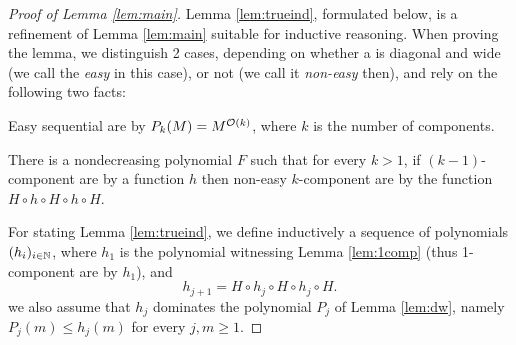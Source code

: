 \begin{proof}[Proof of Lemma \ref{lem:main}]
%
Lemma \ref{lem:trueind}, formulated below, is a refinement of Lemma \ref{lem:main} suitable for 
inductive reasoning.
When proving the lemma, we distinguish 2 cases, depending on whether
a \tvass  is diagonal and wide (we call the \tvass \emph{easy} in this case), 
or not (we call it \emph{non-easy} then), and rely on the following two facts:
%
\begin{lemma} \label{lem:dw}
Easy sequential \tvass are \lb by $P_k(M) = M^{{\cal O}(k)}$, where $k$ is the number of components.
\end{lemma}
%
%
\begin{lemma} \label{lem:ne}
There is a nondecreasing polynomial $F$ such that for every $k > 1$,
if $(k-1)$-component \tvass are \lb by a function $h$ then
non-easy $k$-component \tvass are \lb by the function $H \circ h \circ H \circ h \circ H$.
\end{lemma}
%
For stating Lemma \ref{lem:trueind},
we define inductively a sequence of polynomials $(h_i)_{i\in\mathbb{N}}$, where
$h_1$ is the polynomial witnessing Lemma \ref{lem:1comp}
(thus 1-component \tvass are \lb by $h_1$), and
\[
h_{j+1} = H \circ h_j \circ H \circ h_j \circ H.
\]
\Wlog we also assume that $h_j$ dominates the polynomial $P_j$ of Lemma \ref{lem:dw}, namely
$P_j(m) \leq h_j(m)$ for every $j,m\geq 1$.


\end{proof}
